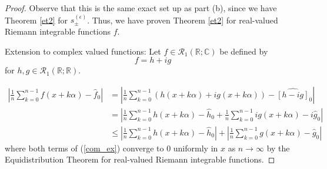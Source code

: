 \documentclass[12pt, reqno]{amsart}
\theoremstyle{definition}
\theoremstyle{remark}
\newcommand{\ud}{\mathrm{d}}
\begin{document}
\begin{itemize}
\begin{itemize}
\begin{proof}
Observe that this is the same exact set up as part (b), since we have Theorem \ref{et2} for $s^{(\epsilon)}_\pm$. Thus, we have proven Theorem \ref{et2} for real-valued Riemann integrable functions $f$. 

\vspace*{10 pt}

Extension to complex valued functions:
Let $f\in\mathcal{R}_1(\mathbb{R};\mathbb{C})$ be defined by $$f=h+ig$$for $h,g\in\mathcal{R}_1(\mathbb{R};\mathbb{R})$.

\begin{align}
\left| \frac{1}{n}\sum_{k=0}^{n-1}f(x+k \alpha)-\hat f_{0}\right|&= \left| \frac{1}{n}\sum_{k=0}^{n-1}(h(x+k \alpha)+ig(x+k \alpha))-\widehat{[h-ig]}_{0}\right|\\
&= \left| \frac{1}{n}\sum_{k=0}^{n-1}h(x+k \alpha)-\hat h_{0}+ \frac{1}{n}\sum_{k=0}^{n-1}ig(x+k \alpha)-i\hat g_{0}\right|\\
&\le \left| \frac{1}{n}\sum_{k=0}^{n-1}h(x+k \alpha)-\hat h_{0}\right|+\left| \frac{1}{n}\sum_{k=0}^{n-1}g(x+k \alpha)-\hat g_{0}\right| \label{com_ex}
\end{align}
where both terms of (\ref{com_ex}) converge to $0$ uniformly in $x$ as $n \rightarrow \infty$ by the Equidistribution Theorem for real-valued Riemann integrable functions.
\end{proof}

\end{itemize}


\end{itemize}
\end{document}
